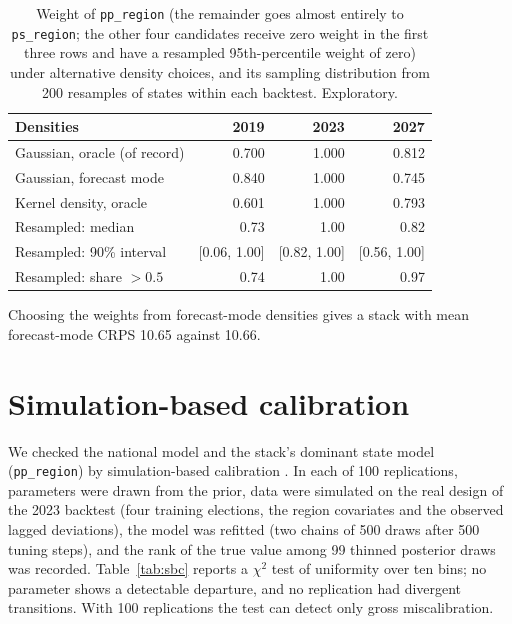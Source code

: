 \documentclass[preprint,12pt,authoryear]{elsarticle}
\begin{document}
\begin{table}[ht]
\centering
\caption{Weight of \texttt{pp\_region} (the remainder goes almost entirely to \texttt{ps\_region}; the other four candidates receive zero weight in the first three rows and have a resampled 95th-percentile weight of zero) under alternative density choices, and its sampling distribution from 200 resamples of states within each backtest. Exploratory.}
\label{tab:weights_robust}
\small
\begin{tabular}{lrrr}
\toprule
Densities & 2019 & 2023 & 2027 \\
\midrule
Gaussian, oracle (of record) & 0.700 & 1.000 & 0.812 \\
Gaussian, forecast mode & 0.840 & 1.000 & 0.745 \\
Kernel density, oracle & 0.601 & 1.000 & 0.793 \\
Resampled: median & 0.73 & 1.00 & 0.82 \\
Resampled: 90\% interval & [0.06, 1.00] & [0.82, 1.00] & [0.56, 1.00] \\
Resampled: share $> 0.5$ & 0.74 & 1.00 & 0.97 \\
\bottomrule
\end{tabular}
\end{table}

Choosing the weights from forecast-mode densities gives a stack with mean forecast-mode CRPS 10.65 against 10.66.

\section{Simulation-based calibration}
\label{app:sbc}
We checked the national model and the stack's dominant state model (\texttt{pp\_region}) by simulation-based calibration \citep{Talts2018SBC}. In each of 100 replications, parameters were drawn from the prior, data were simulated on the real design of the 2023 backtest (four training elections, the region covariates and the observed lagged deviations), the model was refitted (two chains of 500 draws after 500 tuning steps), and the rank of the true value among 99 thinned posterior draws was recorded. Table~\ref{tab:sbc} reports a $\chi^2$ test of uniformity over ten bins; no parameter shows a detectable departure, and no replication had divergent transitions. With 100 replications the test can detect only gross miscalibration.
\end{document}
